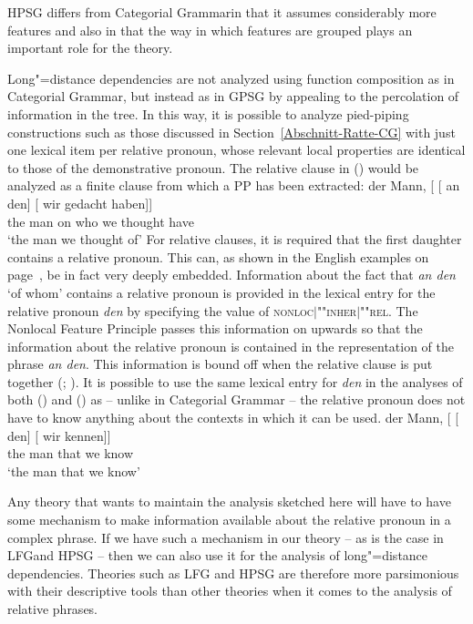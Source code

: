 HPSG differs from Categorial Grammar\indexcg in that it assumes considerably more features and also in that the way in which features are grouped plays
an important role for the theory.

\addlines
Long"=distance dependencies are not analyzed using function composition as in Categorial Grammar, but instead
as in GPSG by appealing to the percolation of information in the tree. In this way, it is possible to analyze pied-piping constructions such as those
discussed in Section~\ref{Abschnitt-Ratte-CG} with just one lexical item per relative pronoun, whose relevant local properties are identical to those of the
demonstrative pronoun. The relative clause in () would be analyzed as a finite clause from which a PP has been extracted:
\ea
\gll der Mann, [ [ an den] [ wir gedacht haben]]\\
     the man   {}        {}        on who  {}          we  thought have\\
\glt `the man we thought of'
\z
For relative clauses, it is required that the first daughter contains a relative pronoun. This can, as shown in the English examples on page~\pageref{Beispiel-Minister},
be in fact very deeply embedded. Information about the fact that \emph{an den} `of whom' contains a relative pronoun is provided in the lexical entry for the relative
pronoun \emph{den} by specifying the value of \textsc{nonloc$|$""inher$|$""rel}.
The Nonlocal Feature Principle passes this information on upwards so that the information about the relative pronoun is contained in the representation
of the phrase \emph{an den}. This information is bound off when the relative clause is put together (\citealp[Chapter~5]{ps2}; \citealp{Sag97a}).
It is possible to use the same lexical entry for \emph{den} in the analyses of both () and
() as -- unlike in Categorial Grammar -- the relative pronoun does not have to know anything about the contexts in which it can be used.
\ea
\gll der Mann, [ [ den] [ wir kennen]]\\
	 the man {} {} that {} we know\\
\glt `the man that we know'
\z
\begin{sloppypar}
\noindent
Any theory that wants to maintain the analysis sketched here will have to have some mechanism to make information available about the relative pronoun
in a complex phrase. If we have such a mechanism in our theory -- as is the case in LFG\indexlfg and HPSG -- then we can also use it for the analysis
of long"=distance dependencies. Theories such as LFG and HPSG are therefore more parsimonious with their descriptive tools than other theories when it comes to
the analysis of relative phrases.
\end{sloppypar}

